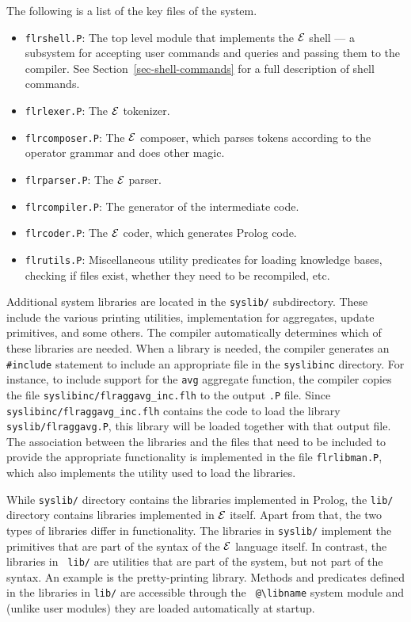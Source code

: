 \documentclass[11pt]{article}
\newcommand{\ERGO}{\mbox{\ensuremath{\cal{E}}\smaller{{\sc{RGO}}}}\xspace}
\newcommand{\FLSYSTEM}{\ERGO}
\newcommand{\bs}{\textbackslash}
\begin{document}
The following is a list of the key files of the system.
\begin{itemize}
\item \texttt{flrshell.P}: The top level module that implements the
  \FLSYSTEM shell --- a subsystem for accepting user commands and queries and
  passing them to the compiler.  See Section~\ref{sec-shell-commands} for a
  full description of shell commands.
\item \texttt{flrlexer.P}: The \FLSYSTEM tokenizer.
\item \texttt{flrcomposer.P}: The \FLSYSTEM composer, which parses tokens
  according to the operator grammar and does other magic.
\item \texttt{flrparser.P}: The \FLSYSTEM parser.
\item \texttt{flrcompiler.P}: The generator of the intermediate code.
\item \texttt{flrcoder.P}: The \FLSYSTEM coder, which generates Prolog code.
\item \texttt{flrutils.P}: Miscellaneous utility predicates for loading
  knowledge bases, checking if files exist, whether they need to be recompiled,
  etc.
\end{itemize}
Additional system libraries are located in the {\tt syslib/} subdirectory.
These include the various printing utilities, implementation for
aggregates, update primitives, and some others. The compiler automatically
determines which of these libraries are needed. When a
library is needed, the compiler generates an {\tt \#include} statement to
include an appropriate file in the {\tt syslibinc} directory. For instance,
to include support for the {\tt avg} aggregate function, the compiler
copies the file {\tt syslibinc/flraggavg\_inc.flh} to the output {\tt .P}
file.  Since {\tt syslibinc/flraggavg\_inc.flh} contains the code to load
the library {\tt syslib/flraggavg.P}, this library will be loaded together
with that output file. The association between the libraries and the files
that need to be included to provide the appropriate functionality is
implemented in the file {\tt flrlibman.P}, which also implements the
utility used to load the libraries.

While {\tt syslib/} directory contains the libraries implemented in Prolog,
the {\tt lib/} directory contains libraries implemented in \FLSYSTEM itself.
Apart from that, the two types of libraries differ in functionality.  The
libraries in {\tt syslib/} implement the primitives that are part of the
syntax of the \FLSYSTEM language itself. In contrast, the libraries in {\tt
  lib/} are utilities that are part of the system, but not part of the
syntax. An example is the pretty-printing library.  Methods and predicates
defined in the libraries in {\tt lib/} are accessible through the {\tt
  @\bs{}libname} system module and (unlike user modules) they are loaded
automatically at startup.
\end{document}
